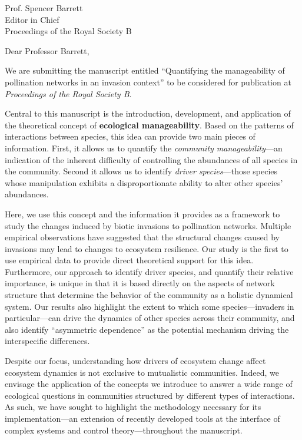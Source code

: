 \documentclass[12pt]{letter}
\begin{document}
\begin{letter}{
       Prof. Spencer Barrett\\
       Editor in Chief\\
       Proceedings of the Royal Society B}

\opening{Dear Professor Barrett,}

We are submitting the manuscript entitled ``Quantifying the manageability of pollination networks in an invasion context'' to be considered for publication at \emph{Proceedings of the Royal Society B}. 

Central to this manuscript is the introduction, development, and application of the theoretical concept of \textbf{ecological manageability}.
Based on the patterns of interactions between species, this idea can provide two main pieces of information. 
First, it allows us to quantify the \textit{community manageability}---an indication of the inherent difficulty of controlling the abundances of all species in the community. 
Second it allows us to identify \textit{driver species}---those species whose manipulation exhibits a disproportionate ability to alter other species' abundances.  

Here, we use this concept and the information it provides as a framework to study the changes induced by biotic invasions to pollination networks. 
Multiple empirical observations have suggested that the structural changes caused by invasions may lead to changes to ecosystem resilience. 
Our study is the first to use empirical data to provide direct theoretical support for this idea. 
Furthermore, our approach to identify driver species, and quantify their relative importance, is unique in that it is based directly on the aspects of network structure that determine the behavior of the community as a holistic dynamical system. 
Our results also highlight the extent to which some species---invaders in particular---can drive the dynamics of other species across their community, and also identify ``asymmetric dependence'' as the potential mechanism driving the interspecific differences.

Despite our focus, understanding how drivers of ecosystem change affect ecosystem dynamics is not exclusive to mutualistic communities. 
Indeed, we envisage the application of the concepts we introduce to answer a wide range of ecological questions in communities structured by different types of interactions.
As such, we have sought to highlight the methodology necessary for its implementation---an extension of recently developed tools at the interface of complex systems and control theory---throughout the manuscript. 


\end{letter}
\end{document}
